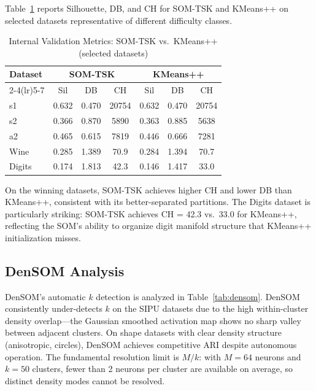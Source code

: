 \documentclass[journal]{IEEEtran}
\begin{document}
Table~\ref{tab:internal} reports Silhouette, DB, and CH for SOM-TSK and KMeans++ on selected datasets representative of different difficulty classes.

\begin{table}[!t]
\caption{Internal Validation Metrics: SOM-TSK vs.\ KMeans++ (selected datasets)}
\label{tab:internal}
\centering
\renewcommand{\arraystretch}{1.05}
\setlength{\tabcolsep}{4pt}
\begin{tabular}{lcccccc}
\toprule
\multirow{2}{*}{Dataset} & \multicolumn{3}{c}{SOM-TSK} & \multicolumn{3}{c}{KMeans++} \\
\cmidrule(lr){2-4}\cmidrule(lr){5-7}
 & Sil & DB & CH & Sil & DB & CH \\
\midrule
s1 & 0.632 & 0.470 & 20754 & 0.632 & 0.470 & 20754 \\
s2 & 0.366 & 0.870 & 5890 & 0.363 & 0.885 & 5638 \\
a2 & 0.465 & 0.615 & 7819 & 0.446 & 0.666 & 7281 \\
Wine & 0.285 & 1.389 & 70.9 & 0.284 & 1.394 & 70.7 \\
Digits & 0.174 & 1.813 & 42.3 & 0.146 & 1.417 & 33.0 \\
\bottomrule
\end{tabular}
\end{table}

On the winning datasets, SOM-TSK achieves higher CH and lower DB than KMeans++, consistent with its better-separated partitions. The Digits dataset is particularly striking: SOM-TSK achieves CH = 42.3 vs.\ 33.0 for KMeans++, reflecting the SOM's ability to organize digit manifold structure that KMeans++ initialization misses.

\subsection{DenSOM Analysis}

DenSOM's automatic $k$ detection is analyzed in Table~\ref{tab:densom}. DenSOM consistently under-detects $k$ on the SIPU datasets due to the high within-cluster density overlap—the Gaussian smoothed activation map shows no sharp valley between adjacent clusters. On shape datasets with clear density structure (anisotropic, circles), DenSOM achieves competitive ARI despite autonomous operation. The fundamental resolution limit is $M/k$: with $M=64$ neurons and $k=50$ clusters, fewer than 2 neurons per cluster are available on average, so distinct density modes cannot be resolved.
\end{document}
